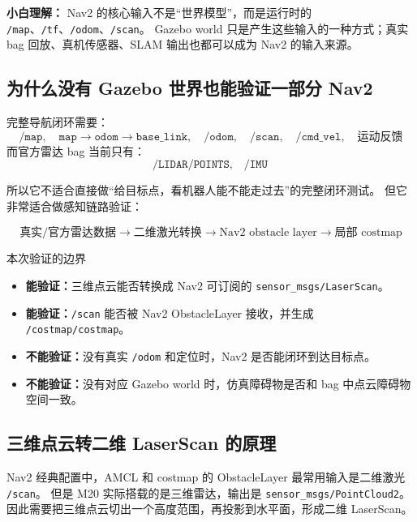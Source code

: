 \documentclass[UTF8,11pt,a4paper]{ctexart}
\begin{document}
\begin{answerbox}
\textbf{小白理解：}
Nav2 的核心输入不是“世界模型”，而是运行时的 \texttt{/map}、\texttt{/tf}、\texttt{/odom}、\texttt{/scan}。
Gazebo world 只是产生这些输入的一种方式；真实 bag 回放、真机传感器、SLAM 输出也都可以成为 Nav2 的输入来源。
\end{answerbox}

\subsection{为什么没有 Gazebo 世界也能验证一部分 Nav2}

完整导航闭环需要：
\[
\boxed{
\texttt{/map},\quad
\texttt{map} \rightarrow \texttt{odom} \rightarrow \texttt{base\_link},\quad
\texttt{/odom},\quad
\texttt{/scan},\quad
\texttt{/cmd\_vel},\quad
\text{运动反馈}
}
\]
而官方雷达 bag 当前只有：
\[
\boxed{
\texttt{/LIDAR/POINTS},\quad \texttt{/IMU}
}
\]

所以它不适合直接做“给目标点，看机器人能不能走过去”的完整闭环测试。
但它非常适合做感知链路验证：

\[
\boxed{
\text{真实/官方雷达数据}
\rightarrow
\text{二维激光转换}
\rightarrow
\text{Nav2 obstacle layer}
\rightarrow
\text{局部 costmap}
}
\]

\begin{greenbox}{本次验证的边界}
\begin{itemize}
  \item \textbf{能验证：}三维点云能否转换成 Nav2 可订阅的 \texttt{sensor\_msgs/LaserScan}。
  \item \textbf{能验证：}\texttt{/scan} 能否被 Nav2 ObstacleLayer 接收，并生成 \texttt{/costmap/costmap}。
  \item \textbf{不能验证：}没有真实 \texttt{/odom} 和定位时，Nav2 是否能闭环到达目标点。
  \item \textbf{不能验证：}没有对应 Gazebo world 时，仿真障碍物是否和 bag 中点云障碍物空间一致。
\end{itemize}
\end{greenbox}

\subsection{三维点云转二维 LaserScan 的原理}

Nav2 经典配置中，AMCL 和 costmap 的 ObstacleLayer 最常用输入是二维激光 \texttt{/scan}。
但是 M20 实际搭载的是三维雷达，输出是 \texttt{sensor\_msgs/PointCloud2}。
因此需要把三维点云切出一个高度范围，再投影到水平面，形成二维 LaserScan。
\end{document}
